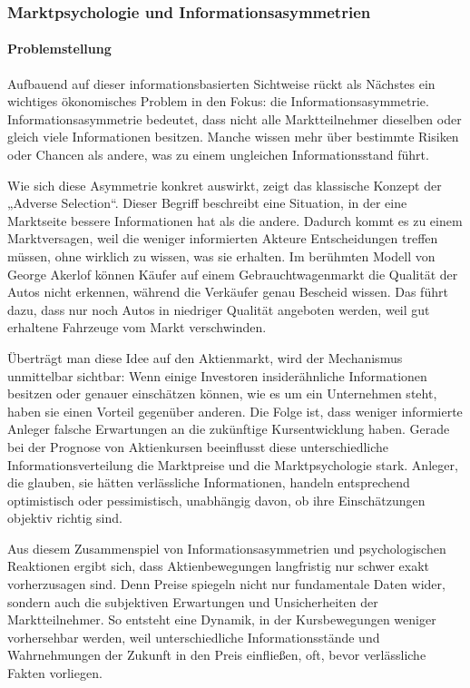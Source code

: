 \subsubsection{Marktpsychologie und Informationsasymmetrien}
\paragraph{Problemstellung}
Aufbauend auf dieser informationsbasierten Sichtweise rückt als Nächstes ein wichtiges ökonomisches Problem in den Fokus: die Informationsasymmetrie. Informationsasymmetrie bedeutet, dass nicht alle Marktteilnehmer dieselben oder gleich viele Informationen besitzen. Manche wissen mehr über bestimmte Risiken oder Chancen als andere, was zu einem ungleichen Informationsstand führt.

Wie sich diese Asymmetrie konkret auswirkt, zeigt das klassische Konzept der „Adverse Selection“. Dieser Begriff beschreibt eine Situation, in der eine Marktseite bessere Informationen hat als die andere. Dadurch kommt es zu einem Marktversagen, weil die weniger informierten Akteure Entscheidungen treffen müssen, ohne wirklich zu wissen, was sie erhalten. Im berühmten Modell von George Akerlof \cite{The_market_of_lemons} können Käufer auf einem Gebrauchtwagenmarkt die Qualität der Autos nicht erkennen, während die Verkäufer genau Bescheid wissen. Das führt dazu, dass nur noch Autos in niedriger Qualität angeboten werden, weil gut erhaltene Fahrzeuge vom Markt verschwinden.

Überträgt man diese Idee auf den Aktienmarkt, wird der Mechanismus unmittelbar sichtbar: Wenn einige Investoren insiderähnliche Informationen besitzen oder genauer einschätzen können, wie es um ein Unternehmen steht, haben sie einen Vorteil gegenüber anderen. Die Folge ist, dass weniger informierte Anleger falsche Erwartungen an die zukünftige Kursentwicklung haben. Gerade bei der Prognose von Aktienkursen beeinflusst diese unterschiedliche Informationsverteilung die Marktpreise und die Marktpsychologie stark. Anleger, die glauben, sie hätten verlässliche Informationen, handeln entsprechend optimistisch oder pessimistisch, unabhängig davon, ob ihre Einschätzungen objektiv richtig sind.

Aus diesem Zusammenspiel von Informationsasymmetrien und psychologischen Reaktionen ergibt sich, dass Aktienbewegungen langfristig nur schwer exakt vorherzusagen sind. Denn Preise spiegeln nicht nur fundamentale Daten wider, sondern auch die subjektiven Erwartungen und Unsicherheiten der Marktteilnehmer. So entsteht eine Dynamik, in der Kursbewegungen weniger vorhersehbar werden, weil unterschiedliche Informationsstände und Wahrnehmungen der Zukunft in den Preis einfließen, oft, bevor verlässliche Fakten vorliegen.


